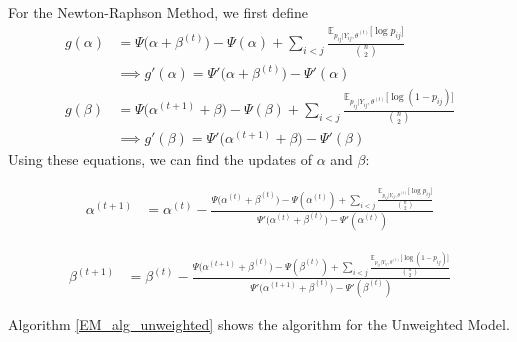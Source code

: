 \documentclass{article}
\begin{document}
For the Newton-Raphson Method, we first define 
\begin{align*}
g(\alpha) &= \Psi \big(\alpha + \beta^{(t)} \big) - \Psi(\alpha) + \sum_{i < j}\frac{ \mathbb{E}_{p_{ij} | Y_{ij}, \theta^{(t)}} \big[\log p_{ij}\big] }{{n \choose 2}} \\
&\implies g'(\alpha) = \Psi' \big(\alpha + \beta^{(t)} \big) - \Psi'(\alpha) \\
g(\beta) &= \Psi \big(\alpha^{(t+1)} + \beta \big) - \Psi(\beta) + \sum_{i < j}\frac{ \mathbb{E}_{p_{ij} | Y_{ij}, \theta^{(t)}} \big[\log (1- p_{ij})\big] }{{n \choose 2}} \\
&\implies g'(\beta) = \Psi' \big(\alpha^{(t+1)}  + \beta\big) - \Psi'(\beta)
\end{align*}
Using these equations, we can find the updates of $\alpha$ and $\beta$:

\begin{align*}
\alpha^{(t+1)} &= \alpha^{(t)} - \frac{\Psi\big(\alpha^{(t)} + \beta^{(t)}\big) - \Psi(\alpha^{(t)}) + \sum_{i < j}\frac{ \mathbb{E}_{p_{ij} | Y_{ij}, \theta^{(t)}} \big[\log p_{ij}\big] }{{n \choose 2}}}{\Psi'\big(\alpha^{(t)} + \beta^{(t)}\big) - \Psi'(\alpha^{(t)})} \tag{$\alpha_U$}
\end{align*}

\begin{align*}
\beta^{(t+1)} &= \beta^{(t)} - \frac{\Psi\big(\alpha^{(t+1)} + \beta^{(t)}\big) - \Psi(\beta^{(t)}) + \sum_{i < j}\frac{ \mathbb{E}_{p_{ij} | Y_{ij}, \theta^{(t)}} \big[\log (1- p_{ij})\big] }{{n \choose 2}}}{\Psi'\big(\alpha^{(t+1)} + \beta^{(t)}\big) - \Psi'(\beta^{(t)})} \tag{$\beta_U$}
\end{align*}


Algorithm \ref{EM_alg_unweighted} shows the algorithm for the Unweighted Model. 
\end{document}
